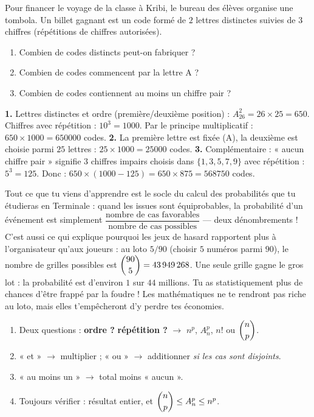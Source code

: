 \documentclass[11pt]{article}
\newcommand{\cle}[1]{{\popxbold\color{popdark}#1}}
\begin{document}
\begin{exercice}
Pour financer le voyage de la classe à Kribi, le bureau des élèves organise une tombola. Un billet gagnant est un code formé de $2$ lettres distinctes suivies de $3$ chiffres (répétitions de chiffres autorisées).
\begin{enumerate}
\item Combien de codes distincts peut-on fabriquer ?
\item Combien de codes commencent par la lettre A ?
\item Combien de codes contiennent au moins un chiffre pair ?
\end{enumerate}
\end{exercice}

\begin{corrige}[Exercice]
\textbf{1.} Lettres distinctes et ordre (première/deuxième position) : $A_{26}^2 = 26 \times 25 = 650$. Chiffres avec répétition : $10^3 = \num{1000}$. Par le principe multiplicatif : $650 \times \num{1000} = \num{650000}$ codes.
\textbf{2.} La première lettre est fixée (A), la deuxième est choisie parmi $25$ lettres : $25 \times \num{1000} = \num{25000}$ codes.
\textbf{3.} Complémentaire : « aucun chiffre pair » signifie $3$ chiffres impairs choisis dans $\{1,3,5,7,9\}$ avec répétition : $5^3 = 125$. Donc : $650 \times (\num{1000} - 125) = 650 \times 875 = \num{568750}$ codes.
\end{corrige}

\begin{savaistu}
Tout ce que tu viens d'apprendre est le socle du calcul des \cle{probabilités} que tu étudieras en Terminale : quand les issues sont équiprobables, la probabilité d'un événement est simplement $\dfrac{\text{nombre de cas favorables}}{\text{nombre de cas possibles}}$ — deux dénombrements ! C'est aussi ce qui explique pourquoi les jeux de hasard rapportent plus à l'organisateur qu'aux joueurs : au loto $5/90$ (choisir $5$ numéros parmi $90$), le nombre de grilles possibles est $\dbinom{90}{5} = \num{43949268}$. Une seule grille gagne le gros lot : la probabilité est d'environ $1$ sur $44$ millions. Tu as statistiquement plus de chances d'être frappé par la foudre ! Les mathématiques ne te rendront pas riche au loto, mais elles t'empêcheront d'y perdre tes économies.
\end{savaistu}

\begin{aretenir}
\begin{enumerate}
\item Deux questions : \textbf{ordre ?} \textbf{répétition ?} $\rightarrow$ $n^p$, $A_n^p$, $n!$ ou $\dbinom{n}{p}$.
\item « et » $\rightarrow$ multiplier ; « ou » $\rightarrow$ additionner \emph{si les cas sont disjoints}.
\item « au moins un » $\rightarrow$ total moins « aucun ».
\item Toujours vérifier : résultat entier, et $\dbinom{n}{p} \leq A_n^p \leq n^p$.
\end{enumerate}
\end{aretenir}
\end{document}
